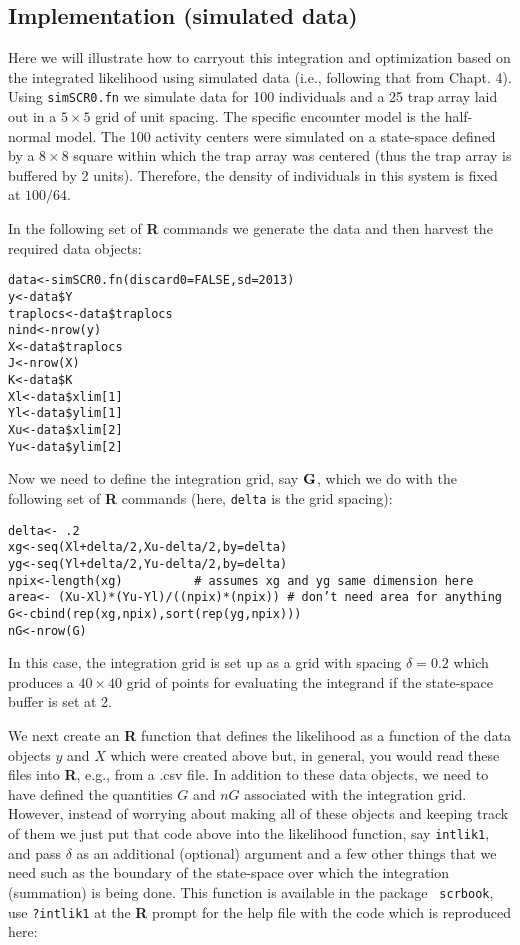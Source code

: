 \subsection{ Implementation (simulated data)}

Here we will illustrate how to carryout this integration and
optimization based on the integrated likelihood using simulated data
 (i.e., following that from Chapt. 4). Using \mbox{\tt simSCR0.fn}
 we simulate data for 100 individuals and a 25 trap array
laid out in a $5 \times 5$ grid of unit spacing.  The specific encounter
model is the half-normal model. The 100 activity centers were
simulated on a state-space defined by a $8 \times 8$ square 
within which the
trap array was centered (thus the trap array is buffered by 2
units). Therefore, the density of individuals in this system is fixed
at $100/64$.

In the following set of {\bf R} commands we generate the data and 
then harvest the required data objects:
{\small
\begin{verbatim}
data<-simSCR0.fn(discard0=FALSE,sd=2013)
y<-data$Y
traplocs<-data$traplocs
nind<-nrow(y)
X<-data$traplocs
J<-nrow(X)
K<-data$K
Xl<-data$xlim[1]
Yl<-data$ylim[1]
Xu<-data$xlim[2]
Yu<-data$ylim[2]
\end{verbatim}
}
Now we need to define the integration grid, say ${\bf G}$, which we do with
the following set of {\bf R} commands (here, \mbox{\tt delta} is the grid spacing):
{\small
\begin{verbatim}
delta<- .2
xg<-seq(Xl+delta/2,Xu-delta/2,by=delta) 
yg<-seq(Yl+delta/2,Yu-delta/2,by=delta) 
npix<-length(xg)          # assumes xg and yg same dimension here
area<- (Xu-Xl)*(Yu-Yl)/((npix)*(npix)) # don’t need area for anything
G<-cbind(rep(xg,npix),sort(rep(yg,npix)))
nG<-nrow(G)
\end{verbatim}
}
In this case, the integration grid is set up as a grid with spacing
$\delta = 0.2$ which produces a $40 \times 40$ grid of points for evaluating the
integrand if the state-space buffer is set at 2.

We next create an {\bf R} function that defines the likelihood as a
function of the data objects $y$ and $X$ which were created above but,
in general, you would read these files into {\bf R}, e.g., from a .csv
file.  In addition to these data objects, we need to have defined the
quantities $G$ and $nG$ associated with the integration grid.
However, instead of worrying about making all of these objects and
keeping track of them we just put that code above into the likelihood
function, say \mbox{\tt intlik1}, and pass $\delta$ as an additional
(optional) argument and a few other things that we need such as the
boundary of the state-space over which the integration (summation) is
being done. This function is available in the package \mbox{\tt
  scrbook}, use {\tt ?intlik1} at the {\bf R} prompt for the help file
with the code which is reproduced here:


